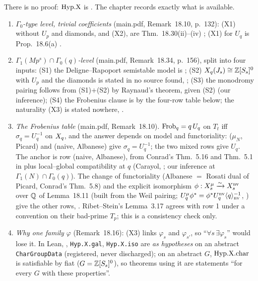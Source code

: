 \begin{outline}
There is no proof: $\mathrm{Hyp.X}$ is \sthyp. The chapter records exactly what is available.
\begin{enumerate}[label=(\arabic*)]
\item {}\label{rpt:rem:s05-Xstatus}\emph{$\Gamma_0$-type level, trivial coefficients} (main.pdf, Remark~18.10, p.~132): (X1) without $U_p$ and diamonds, and (X2),
  are Thm.~18.30(ii)--(iv) \stcited; (X1) for $U_q$ is Prop.~18.6(a) \stpmc.
\item \emph{$\Gamma_1(Mp^s)\cap\Gamma_0(q)$-level} (main.pdf, Remark~18.34, p.~156), split into four inputs: (S1) the
  Deligne--Rapoport semistable model is \stcited{} \cite[Ch.~VI, Thm.~6.9, pp.~286--287]{DR}; (S2) $X_q(J_s)\cong\mathbb{Z}[S_s]^0$ with $U_p$ and the
  diamonds is stated in no source found, \stexp; (S3) the monodromy pairing follows from (S1)$+$(S2) by Raynaud's theorem, \stpmc{} given
  (S2) (our inference); (S4) the Frobenius clause is \stpmc{} by the four-row table below; the naturality (X3) is stated nowhere, \stexp.
\item \emph{The Frobenius table} (main.pdf, Remark~18.10). $\mathrm{Frob}_q=q\,U_q$ on $T_t$ iff $\sigma_q=U_q^{-1}$ on $X_q$, and the answer
  depends on model and functoriality: ($\mu_N$, Picard) and (naive, Albanese) give $\sigma_q=U_q^{-1}$; the two mixed rows give $U_q$.
  The anchor is row (naive, Albanese), \stpmc{} from Conrad's Thm.~5.16 and Thm.~5.1 in \cite{RS} plus local--global compatibility at $q$
  (Carayol, \cite{Car86}; our inference at $\Gamma_1(N)\cap\Gamma_0(q)$). The change of functoriality (Albanese $=$ Rosati dual of Picard,
  Conrad's Thm.~5.8) and the explicit isomorphism $\phi:X_s^\mu\xrightarrow\sim X_s^{\rm nv}$ over $\mathbb{Q}$ of Lemma~18.11 (built from the Weil
  pairing; $U^\mu_q\phi^*=\phi^*U^{\rm nv}_q\langle q\rangle^{-1}_{\rm nv}$, \stpmc) give the other rows, \stpmc. Ribet--Stein's Lemma~3.17
  \cite[p.~46]{RS} agrees with row 1 under a convention on their bad-prime $T_p$; this is a consistency check only.
\item \emph{Why one family $\varphi$} (Remark~18.16): (X3) links $\varphi_s$ and $\varphi_{s'}$, so ``$\forall s\,\exists\varphi_s$'' would lose
  it. In Lean, , \texttt{Hyp.X.gal}, \texttt{Hyp.X.iso} are \stformal{} \emph{as hypotheses} on an abstract
  \texttt{CharGroupData} (registered, never discharged); on an abstract $G$, $\mathrm{Hyp.X.char}$ is satisfiable by fiat ($G=\mathbb{Z}[S_s]^0$), so
  theorems using it are statements ``for every $G$ with these properties''.
\end{enumerate}
\end{outline}

